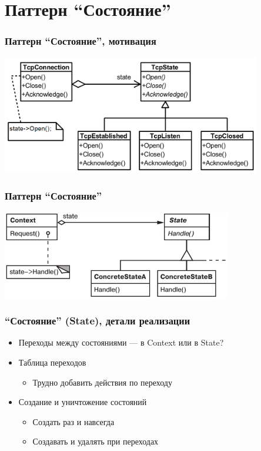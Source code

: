 \documentclass{../../slides-style}
\begin{document}
    \section{Паттерн ``Состояние''}

    \begin{frame}
        \frametitle{Паттерн ``Состояние'', мотивация}
        \begin{center}
            \includegraphics[width=0.85\textwidth]{stateExample.png}
        \end{center}
    \end{frame}

    \begin{frame}
        \frametitle{Паттерн ``Состояние''}
        \begin{center}
            \includegraphics[width=0.75\textwidth]{state.png}
        \end{center}
    \end{frame}

    \begin{frame}
        \frametitle{``Состояние'' (State), детали реализации}
        \begin{itemize}
            \item Переходы между состояниями --- в Context или в State?
            \item Таблица переходов
            \begin{itemize}
                \item Трудно добавить действия по переходу
            \end{itemize}
            \item Создание и уничтожение состояний
            \begin{itemize}
                \item Создать раз и навсегда
                \item Создавать и удалять при переходах
            \end{itemize}
        \end{itemize}
    \end{frame}
\end{document}
